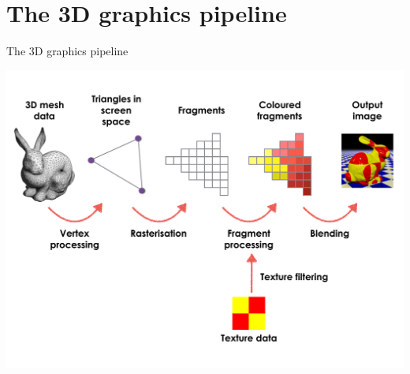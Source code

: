 \part{The 3D graphics pipeline}
\frame{\partpage}

\begin{frame}{The 3D graphics pipeline}
	\begin{center}
		\includegraphics[height=0.7\textheight]{pipeline}
	\end{center}
\end{frame}

